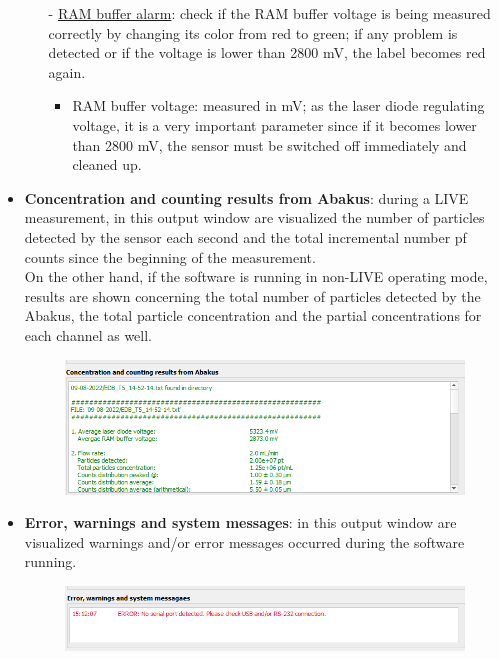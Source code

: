 \documentclass[a4paper, 11pt]{report}
\begin{document}
\begin{itemize}
\begin{itemize}
\begin{itemize}
\end{itemize}
\item[-] \underline{RAM buffer alarm}: check if the RAM buffer voltage is being measured correctly by changing its color from red to green; if any problem is detected or if the voltage is lower than 2800 mV, the label becomes red again.
\begin{itemize}
\item RAM buffer voltage: measured in mV; as the laser diode regulating voltage, it is a very important parameter since if it becomes lower than 2800 mV, the sensor must be switched off immediately and cleaned up.
\end{itemize}
\end{itemize}
\item \textbf{Concentration and counting results from Abakus}: during a LIVE measurement, in this output window are visualized the number of particles detected by the sensor each second and the total incremental number pf counts since the beginning of the measurement. \\
On the other hand, if the software is running in non-LIVE operating mode, results are shown concerning the total number of particles detected by the Abakus, the total particle concentration and the partial concentrations for each channel as well.
\begin{figure}[!hp]
	\centering
	\includegraphics[scale=0.8]{analysis_start.png}
\end{figure}
\newpage
\item \textbf{Error, warnings and system messages}: in this output window are visualized warnings and/or error messages occurred during the software running. \\
\begin{figure}[!hp]
	\centering
	\includegraphics[scale=0.8]{error.png}

\end{figure}
\end{itemize}
\end{document}
